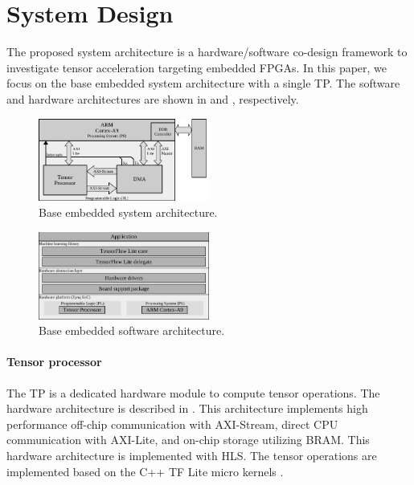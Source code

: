 \section{System Design}
\label{sec:system_design}
The proposed system architecture is a hardware/software co-design framework to investigate tensor acceleration targeting embedded FPGAs. In this paper, we focus on the base embedded system architecture with a single TP. The software and hardware architectures are shown in  and , respectively.

\begin{figure}[t!]
	\centering
	\includegraphics[width=0.5\textwidth]{../figures/system_design.pdf}
	\caption{Base embedded system architecture.}
	\label{fig:system_architecture}
\end{figure}

\begin{figure}[t!]
	\centering
	\includegraphics[width=0.5\textwidth]{../figures/sw_stack.pdf}
	\caption{Base embedded software architecture.}
	\label{fig:sw_stack}
\end{figure}

\paragraph{\textbf{Tensor processor}}
The TP is a dedicated hardware module to compute tensor operations. The hardware architecture is described in . This architecture implements high performance off-chip communication with AXI-Stream, direct CPU communication with AXI-Lite, and on-chip storage utilizing BRAM. This hardware architecture is implemented with HLS. The tensor operations are implemented based on the C++ TF Lite micro kernels \cite{tfLiteMicro}.

